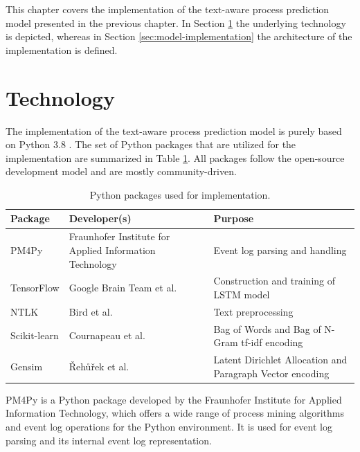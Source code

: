 This chapter covers the implementation of the text-aware process prediction model presented in the previous chapter.
In Section \ref{sec:technology} the underlying technology is depicted, whereas in Section \ref{sec:model-implementation} the architecture of the implementation is defined.

\section{Technology}\label{sec:technology}

The implementation of the text-aware process prediction model is purely based on Python 3.8 \cite{python}.
The set of Python packages that are utilized for the implementation are summarized in Table \ref{tab:packages}.
All packages follow the open-source development model and are mostly community-driven.

\begin{table}[!htbp]
	\begin{tabularx}{\textwidth}{l p{4.5cm} p{6.6cm} }
		\toprule
		\textbf{Package} & \textbf{Developer(s)} & \textbf{Purpose}  \\
		\midrule
		PM4Py \cite{DBLP:journals/corr/abs-1905-06169}   &  Fraunhofer Institute for Applied Information Technology &  Event log parsing and handling\\
		TensorFlow \cite{DBLP:journals/corr/AbadiABBCCCDDDG16} &  Google Brain Team et al.& Construction and training of LSTM model \\
		NTLK \cite{DBLP:books/daglib/0022921} & Bird et al. & Text preprocessing\\
		Scikit-learn \cite{DBLP:journals/jmlr/PedregosaVGMTGBPWDVPCBPD11} & Cournapeau et al.& Bag of Words and Bag of N-Gram tf-idf encoding \\
		Gensim \cite{rehurek_lrec} & Řehůřek et al. & Latent Dirichlet Allocation and Paragraph Vector encoding \\
		 \bottomrule
	\end{tabularx}
	\caption[Python packages used for implementation]{Python packages used for implementation.}
	\label{tab:packages}
\end{table}

PM4Py \cite{DBLP:journals/corr/abs-1905-06169} is a Python package developed by the Fraunhofer Institute for Applied Information Technology, which offers a wide range of process mining algorithms and event log operations for the Python environment.
It is used for event log parsing and its internal event log representation.

